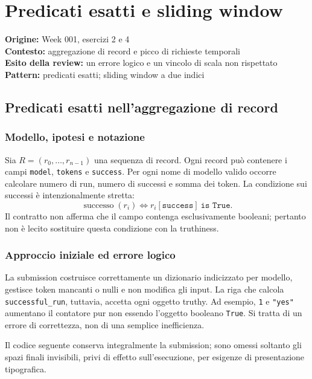 \chapter{Predicati esatti e sliding window}

\begin{flushleft}
\textbf{Origine:} Week 001, esercizi 2 e 4\\
\textbf{Contesto:} aggregazione di record e picco di richieste temporali\\
\textbf{Esito della review:} un errore logico e un vincolo di scala non rispettato\\
\textbf{Pattern:} predicati esatti; sliding window a due indici
\end{flushleft}

\section{Predicati esatti nell'aggregazione di record}

\subsection{Modello, ipotesi e notazione}

Sia $R=(r_0,\ldots,r_{n-1})$ una sequenza di record. Ogni record può
contenere i campi \texttt{model}, \texttt{tokens} e \texttt{success}. Per
ogni nome di modello valido occorre calcolare numero di run, numero di
successi e somma dei token. La condizione sui successi è intenzionalmente
stretta:
\[
\operatorname{successo}(r_i) \iff r_i[\texttt{success}]\ \texttt{is True}.
\]
Il contratto non afferma che il campo contenga esclusivamente booleani;
pertanto non è lecito sostituire questa condizione con la truthiness.

\subsection{Approccio iniziale ed errore logico}

La submission costruisce correttamente un dizionario indicizzato per modello,
gestisce token mancanti o nulli e non modifica gli input. La riga che calcola
\texttt{successful\_run}, tuttavia, accetta ogni oggetto truthy. Ad esempio,
\texttt{1} e \texttt{"yes"} aumentano il contatore pur non essendo l'oggetto
booleano \texttt{True}. Si tratta di un errore di correttezza, non di una
semplice inefficienza.

Il codice seguente conserva integralmente la submission; sono omessi soltanto
gli spazi finali invisibili, privi di effetto sull'esecuzione, per esigenze di
presentazione tipografica.

